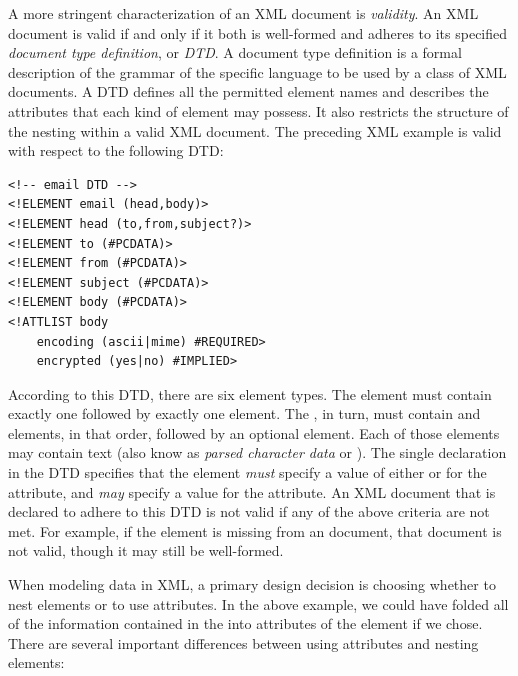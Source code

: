 \documentclass{article}
\begin{document}
A more stringent characterization of an XML document is \emph{validity}.
An XML document is valid if and only if it both is well-formed and
adheres to its specified \emph{document type definition}, or \emph{DTD}.
A document type definition is a formal description of the grammar of the
specific language to be used by a class of XML documents.  A DTD defines
all the permitted element names and describes the attributes that each
kind of element may possess. It also restricts the structure of the
nesting within a valid XML document.  The preceding XML example is valid
with respect to the following DTD:

\begin{verbatim}
<!-- email DTD -->
<!ELEMENT email (head,body)>
<!ELEMENT head (to,from,subject?)>
<!ELEMENT to (#PCDATA)>
<!ELEMENT from (#PCDATA)>
<!ELEMENT subject (#PCDATA)>
<!ELEMENT body (#PCDATA)>
<!ATTLIST body
    encoding (ascii|mime) #REQUIRED>
    encrypted (yes|no) #IMPLIED>
\end{verbatim}

According to this DTD, there are six element types. The 
element must contain exactly one  followed by exactly one
 element.  The , in turn, must contain
 and  elements, in that order, followed by
an optional  element.  Each of those elements may
contain text (also know as \emph{parsed character data} or
).  The single  declaration in the
DTD specifies that the  element \emph{must} specify a
value of either  or  for the
 attribute, and \emph{may} specify a value for the
 attribute.  An XML document that is declared to
adhere to this DTD is not valid if any of the above criteria are not
met.  For example, if the  element is missing from an
 document, that document is not valid, though it may
still be well-formed.

When modeling data in XML, a primary design decision is choosing whether
to nest elements or to use attributes.  In the above example, we could
have folded all of the information contained in the  into
attributes of the  element if we chose.  There are
several important differences between using attributes and nesting
elements:
\end{document}
